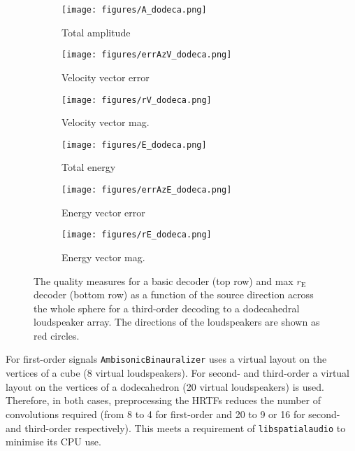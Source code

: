 \documentclass[12pt]{report}
\def\libspataud{\texttt{libspatialaudio}\xspace}
\newcommand{\code}[1]{\texttt{#1}}
\begin{document}
\begin{figure}[tbp]
  \centering

  \begin{subfigure}{0.3\textwidth}
    \texttt{[image: figures/A\_dodeca.png]}
    \caption{\centering Total amplitude}
  \end{subfigure}
  \hfill
  \begin{subfigure}{0.3\textwidth}
    \texttt{[image: figures/errAzV\_dodeca.png]}
    \caption{\centering Velocity vector error}
  \end{subfigure}
  \hfill
    \begin{subfigure}{0.3\textwidth}
    \texttt{[image: figures/rV\_dodeca.png]}
    \caption{\centering Velocity vector mag.}
  \end{subfigure}
  \newline
    \begin{subfigure}{0.3\textwidth}
    \texttt{[image: figures/E\_dodeca.png]}
    \caption{\centering Total energy}
  \end{subfigure}
  \hfill
    \begin{subfigure}{0.3\textwidth}
    \texttt{[image: figures/errAzE\_dodeca.png]}
    \caption{\centering Energy vector error}
  \end{subfigure}
  \hfill
  \begin{subfigure}{0.3\textwidth}
    \texttt{[image: figures/rE\_dodeca.png]}
    \caption{\centering Energy vector mag.}
  \end{subfigure}
    \caption{The quality measures for a basic decoder (top row) and max $r_{\mathrm{E}}$ decoder (bottom row) as a function of the source direction across the whole sphere for a third-order decoding to a dodecahedral loudspeaker array.
    The directions of the loudspeakers are shown as red circles.}
  \label{fig:dodeca_third_order}
\end{figure}

For first-order signals \code{AmbisonicBinauralizer} uses a virtual layout on the vertices of a cube (8 virtual loudspeakers).
For second- and third-order a virtual layout on the vertices of a dodecahedron (20 virtual loudspeakers) is used.
Therefore, in both cases, preprocessing the HRTFs reduces the number of convolutions required (from 8 to 4 for first-order and 20 to 9 or 16 for second- and third-order respectively).
This meets a requirement of \libspataud to minimise its CPU use.
\end{document}
